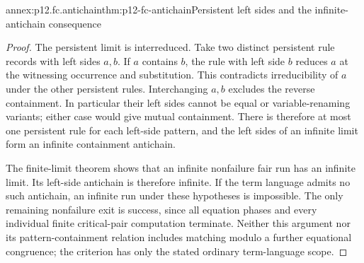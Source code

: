 \begin{annexitem}{annex:p12.fc.antichain}{thm:p12-fc-antichain}{Persistent left sides and the infinite-antichain consequence}
\begin{proof}
The persistent limit is interreduced. Take two distinct persistent
rule records with left sides \(a,b\). If \(a\) contains \(b\),
the rule with left side \(b\) reduces \(a\) at the witnessing
occurrence and substitution. This contradicts irreducibility of
\(a\) under the other persistent rules. Interchanging \(a,b\)
excludes the reverse containment. In particular their left sides
cannot be equal or variable-renaming variants; either case would
give mutual containment. There is therefore at most one persistent
rule for each left-side pattern, and the left sides of an infinite
limit form an infinite containment antichain.

The finite-limit theorem shows that an infinite nonfailure fair run
has an infinite limit. Its left-side antichain is therefore infinite.
If the term language admits no such antichain, an infinite run under
these hypotheses is impossible. The only remaining nonfailure exit
is success, since all equation phases and every individual finite
critical-pair computation terminate. Neither this argument nor its
pattern-containment relation includes matching modulo a further
equational congruence; the criterion has only the stated ordinary
term-language scope.
\end{proof}
\end{annexitem}

